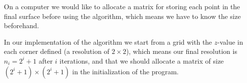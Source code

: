 On a computer we would like to allocate a matrix for storing each point in the final surface before using the algorithm, which means we have to know the size beforehand.

In our implementation of the algorithm we start from a grid with the $z$-value in each corner defined (a resolution of $2\times 2$), which means our final resolution is $n_i = 2^i + 1$ after $i$ iterations, and that we should allocate a matrix of size $(2^i + 1) \times (2^i + 1)$ in the initialization of the program.


%     

%     

% 
% 
% 


